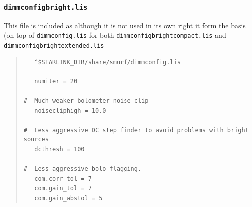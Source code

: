\documentclass[twoside,11pt]{article}
\renewcommand{\_}{\texttt{\symbol{95}}}
\newcommand{\file}[1]{\texttt{#1}}
\begin{document}
\subsubsection{\file{dimmconfig\_bright.lis}}

This file is included as although it is not used in its own right it
form the basis (on top of \file{dimmconfig.lis} for both
\file{dimmconfig\_bright\_compact.lis} and
\file{dimmconfig\_bright\_extended.lis}
\begin{quote}
\begin{verbatim}
   ^$STARLINK_DIR/share/smurf/dimmconfig.lis

   numiter = 20

#  Much weaker bolometer noise clip
   noisecliphigh = 10.0

#  Less aggressive DC step finder to avoid problems with bright sources
   dcthresh = 100

#  Less aggressive bolo flagging.
   com.corr_tol = 7
   com.gain_tol = 7
   com.gain_abstol = 5
\end{verbatim}
\end{quote}
\end{document}
